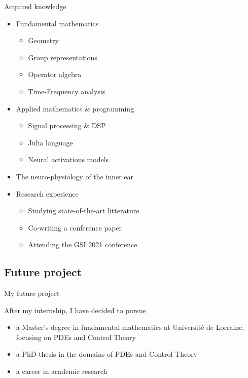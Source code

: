 \documentclass[10pt,american,ignorenonframetext,aspectratio=1610]{beamer}
\providecommand{\tightlist}{%
  \setlength{\itemsep}{0pt}\setlength{\parskip}{0pt}}
\theoremstyle{remark}
\begin{document}
\begin{frame}{Acquired knowledge}
\protect\hypertarget{acquired-knowledge-1}{}

\begin{itemize}
\tightlist
\item
  Fundamental mathematics

  \begin{itemize}
  \tightlist
  \item
    Geometry
  \item
    Group representations
  \item
    Operator algebra
  \item
    Time-Frequency analysis
  \end{itemize}
\item
  Applied mathematics \& programming

  \begin{itemize}
  \tightlist
  \item
    Signal processing \& DSP
  \item
    Julia language
  \item
    Neural activations models
  \end{itemize}
\item
  The neuro-physiology of the inner ear
\item
  Research experience

  \begin{itemize}
  \tightlist
  \item
    Studying state-of-the-art litterature
  \item
    Co-writing a conference paper
  \item
    Attending the GSI 2021 conference
  \end{itemize}
\end{itemize}

\end{frame}

\hypertarget{future-project}{%
\subsection{Future project}\label{future-project}}

\begin{frame}{My future project}
\protect\hypertarget{my-future-project}{}

After my internship, I have decided to pursue

\begin{itemize}
\tightlist
\item
  a Master's degree in fundamental mathematics at Université de
  Lorraine, focusing on PDEs and Control Theory
\item
  a PhD thesis in the domains of PDEs and Control Theory
\item
  a career in academic research
\end{itemize}

\end{frame}
\end{document}
